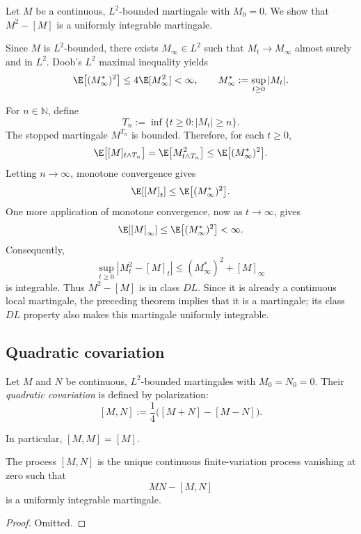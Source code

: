 Let \(M\) be a continuous, \(L^2\)-bounded martingale with \(M_0=0\).
We show that \(M^2-[M]\) is a uniformly integrable martingale.

Since \(M\) is \(L^2\)-bounded, there exists \(M_\infty\in L^2\) such that
\(M_t\to M_\infty\) almost surely and in \(L^2\). Doob's \(L^2\) maximal
inequality yields
\[
    \E\bigl[(M_\infty^*)^2\bigr]
    \leq 4\E[M_\infty^2]<\infty,
    \qquad
    M_\infty^*:=\sup_{t\geq0}|M_t|.
\]

For \(n\in\mathbb N\), define
\[
    T_n:=\inf\{t\geq0:|M_t|\geq n\}.
\]
The stopped martingale \(M^{T_n}\) is bounded. Therefore, for each \(t\geq0\),
\[
    \E\bigl[[M]_{t\wedge T_n}\bigr]
    =\E\bigl[M_{t\wedge T_n}^2\bigr]
    \leq\E\bigl[(M_\infty^*)^2\bigr].
\]
Letting \(n\to\infty\), monotone convergence gives
\[
    \E[[M]_t]\leq\E\bigl[(M_\infty^*)^2\bigr].
\]
One more application of monotone convergence, now as \(t\to\infty\), gives
\[
    \E[[M]_\infty]
    \leq\E\bigl[(M_\infty^*)^2\bigr]<\infty.
\]
Consequently,
\[
    \sup_{t\geq0}|M_t^2-[M]_t|
    \leq (M_\infty^*)^2+[M]_\infty
\]
is integrable. Thus \(M^2-[M]\) is in class \(DL\). Since it is already a
continuous local martingale, the preceding theorem implies that it is a
martingale; its class \(DL\) property also makes this martingale uniformly
integrable.

\subsection*{Quadratic covariation}

\begin{definition}
Let \(M\) and \(N\) be continuous, \(L^2\)-bounded martingales with
\(M_0=N_0=0\). Their \emph{quadratic covariation} is defined by polarization:
\[
    [M,N]:=\frac14\bigl([M+N]-[M-N]\bigr).
\]
\end{definition}

In particular, \([M,M]=[M]\).

\begin{theorem}
The process \([M,N]\) is the unique continuous finite-variation process
vanishing at zero such that
\[
    MN-[M,N]
\]
is a uniformly integrable martingale.
\end{theorem}

\begin{proof}
Omitted.
\end{proof}
